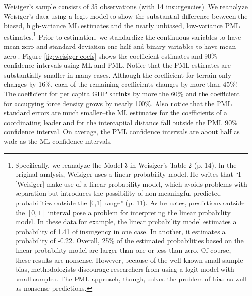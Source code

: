\documentclass[12pt]{article}
\begin{document}
\begin{appendix}
Weisiger's sample consists of 35 observations (with 14 insurgencies).
We reanalyze Weisiger's data using a logit model to show the substantial difference between the biased, high-variance ML estimates and the nearly unbiased, low-variance PML estimates.\footnote{Specifically, we reanalyze the Model 3 in Weisiger's Table 2 (p. 14).
In the original analysis, Weisiger uses a linear probability model.
He writes that ``I [Weisiger] make use of a linear probability model, which avoids problems with separation but introduces the possibility of non-meaningful predicted probabilities outside the [0,1] range'' (p. 11).
As he notes, predictions outside the $[0, 1]$ interval pose a problem for interpreting the linear probability model.
In these data for example, the linear probability model estimates a probability of 1.41 of insurgency in one case.
In another, it estimates a probability of -0.22.
Overall, 25\% of the estimated probabilities based on the linear probability model are larger than one or less than zero.
Of course, these results are nonsense.
However, because of the well-known small-sample bias, methodologists discourage researchers from using a logit model with small samples.
The PML approach, though, solves the problem of bias as well as nonsense predictions.} Prior to estimation, we standardize the continuous variables to have mean zero and standard deviation one-half and binary variables to have mean zero \citep{Gelman2008}.
Figure \ref{fig:weisiger-coefs} shows the coefficient estimates and 90\% confidence intervals using ML and PML.
Notice that the PML estimates are substantially smaller in many cases.
Although the coefficient for terrain only changes by 16\%, each of the remaining coefficients changes by more than 45\%!
The coefficient for per capita GDP shrinks by more the 60\% and the coefficient for occupying force density grows by nearly 100\%.
Also notice that the PML standard errors are much smaller--the ML estimates for the coefficients of a coordinating leader and for the intercapital distance fall outside the PML 90\% confidence interval.
On average, the PML confidence intervals are about half as wide as the ML confidence intervals.


\end{appendix}
\end{document}

